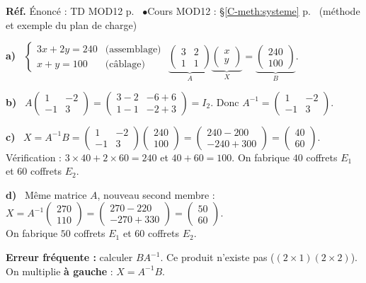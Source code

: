 \documentclass[a4paper,11pt]{article}
\newcommand{\M}[1]{\begin{pmatrix}#1\end{pmatrix}}
\newcommand{\cours}[1]{§\ref{C-#1} p.~\pageref{C-#1}}
\newcommand{\source}[2]{{\footnotesize\color{uimmgray}\textbf{Réf.} \enspace Énoncé : TD MOD12 p.~\pageref{T-#1} \enspace$\bullet$\enspace Cours MOD12 : #2}\par\smallskip}
\newcommand{\q}[1]{\textbf{\color{uimmblue}#1}\ }
\begin{document}
\begin{correction}
\source{exo:13}{\cours{meth:systeme} (méthode et exemple du plan de charge)}
\q{a)} $\left\{\begin{array}{ll} 3x + 2y = 240 & \text{(assemblage)}\\ x + y = 100 & \text{(câblage)}\end{array}\right.$
\qquad
$\underbrace{\M{3 & 2\\ 1 & 1}}_{A}\underbrace{\M{x\\y}}_{X} = \underbrace{\M{240\\100}}_{B}$.

\q{b)} $A\M{1 & -2\\ -1 & 3} = \M{3-2 & -6+6\\ 1-1 & -2+3} = I_2$. Donc $A^{-1} = \M{1 & -2\\ -1 & 3}$.

\q{c)} $X = A^{-1}B = \M{1 & -2\\ -1 & 3}\M{240\\100} = \M{240 - 200\\ -240 + 300} = \M{40\\60}$.\\
Vérification : $3\times 40 + 2\times 60 = 240$ et $40 + 60 = 100$. On fabrique $40$ coffrets $E_1$ et $60$ coffrets $E_2$.

\q{d)} Même matrice $A$, nouveau second membre : $X = A^{-1}\M{270\\110} = \M{270 - 220\\ -270 + 330} = \M{50\\60}$.\\
On fabrique $50$ coffrets $E_1$ et $60$ coffrets $E_2$.
\begin{piege}
\textbf{Erreur fréquente :} calculer $BA^{-1}$. Ce produit n'existe pas ($(2\times 1)(2\times 2)$). On multiplie \textbf{à gauche} : $X = A^{-1}B$.
\end{piege}
\end{correction}
\end{document}
